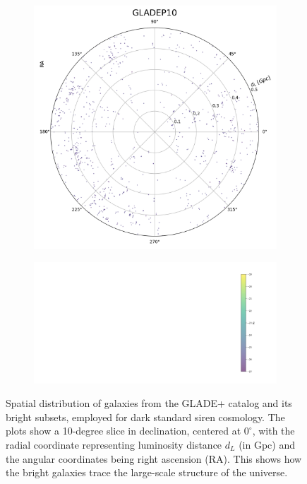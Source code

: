 \begin{figure}[h!]
  \vspace{0.5em}

  \begin{subfigure}{0.32\textwidth}
    \includegraphics[width=\linewidth]{figures/test_frame_g_9.png}
    \label{fig:gladep10}
  \end{subfigure}
  \begin{subfigure}{0.64\textwidth}
    \centering
    \includegraphics[width=\linewidth]{figures/test_frame_g_colorbar.png}
    \vspace{0.02em}
  \end{subfigure}

  \caption[Spatial distribution of galaxies from the GLADE+ galaxy catalog and its subsets.]{Spatial distribution of galaxies from the GLADE+ catalog and its bright subsets, employed for dark standard siren cosmology. The plots show a 10-degree slice in declination, centered at $0^\circ$, with the radial coordinate representing luminosity distance $d_L$ (in Gpc) and the angular coordinates being right ascension (RA). This shows how the bright galaxies trace the large-scale structure of the universe.}
  \label{fig:dist_gladep}
\end{figure}


